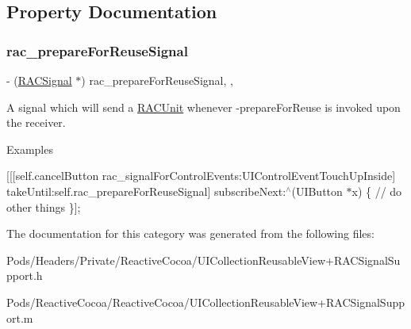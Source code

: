 \subsection{Property Documentation}
\mbox{\label{category_u_i_collection_reusable_view_07_r_a_c_signal_support_08_a59adfeb852087723b2a7d9736b27d8d5}} 
\subsubsection{\texorpdfstring{rac\+\_\+prepare\+For\+Reuse\+Signal}{rac\_prepareForReuseSignal}}
{\footnotesize\ttfamily -\/ (\mbox{\hyperlink{interface_r_a_c_signal}{R\+A\+C\+Signal}} $\ast$) rac\+\_\+prepare\+For\+Reuse\+Signal\hspace{0.3cm}{\ttfamily [read]}, {\ttfamily [nonatomic]}, {\ttfamily [strong]}}

A signal which will send a \mbox{\hyperlink{interface_r_a_c_unit}{R\+A\+C\+Unit}} whenever -\/prepare\+For\+Reuse is invoked upon the receiver.

Examples

\mbox{[}\mbox{[}\mbox{[}self.\+cancel\+Button rac\+\_\+signal\+For\+Control\+Events\+:U\+I\+Control\+Event\+Touch\+Up\+Inside\mbox{]} take\+Until\+:self.\+rac\+\_\+prepare\+For\+Reuse\+Signal\mbox{]} subscribe\+Next\+:$^\wedge$(U\+I\+Button $\ast$x) \{ // do other things \}\mbox{]}; 

The documentation for this category was generated from the following files\+:\begin{DoxyCompactItemize}
\item 
Pods/\+Headers/\+Private/\+Reactive\+Cocoa/U\+I\+Collection\+Reusable\+View+\+R\+A\+C\+Signal\+Support.\+h\item 
Pods/\+Reactive\+Cocoa/\+Reactive\+Cocoa/U\+I\+Collection\+Reusable\+View+\+R\+A\+C\+Signal\+Support.\+m\end{DoxyCompactItemize}
